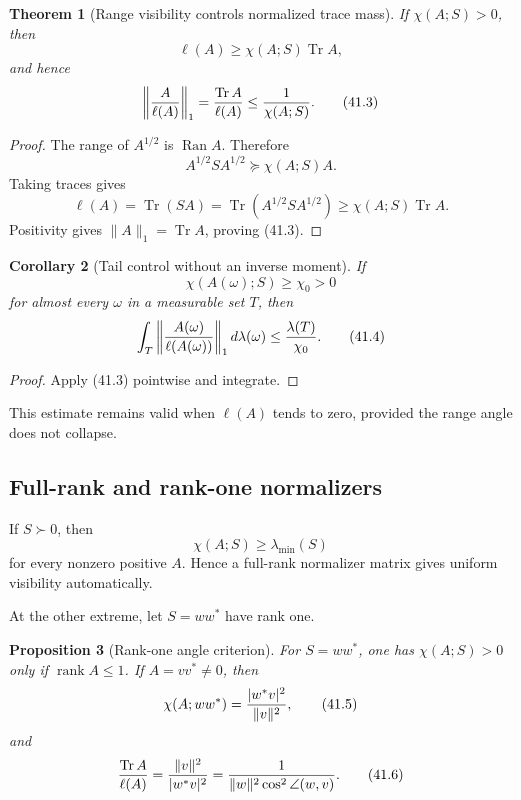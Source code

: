 \documentclass[11pt]{article}
\newtheorem{theorem}{Theorem}[section]
\newtheorem{proposition}[theorem]{Proposition}
\newtheorem{corollary}[theorem]{Corollary}
\theoremstyle{remark}
\begin{document}
\begin{theorem}[Range visibility controls normalized trace mass]
\label{thm:v12v41-visibility}
If \(\chi(A;S)>0\), then
\begin{equation}
 \ell(A)\geq\chi(A;S)\operatorname{Tr}A,           \tag{41.2}
\end{equation}
and hence
\begin{equation}
 \left\|{A\over\ell(A)}\right\|_1
 =
 {\operatorname{Tr}A\over\ell(A)}
 \leq {1\over\chi(A;S)}.                          \tag{41.3}
\end{equation}
\end{theorem}

\begin{proof}
The range of \(A^{1/2}\) is \(\operatorname{Ran}A\).  Therefore
\[
 A^{1/2}SA^{1/2}
 \succeq
 \chi(A;S)A.
\]
Taking traces gives
\[
 \ell(A)
 =
 \operatorname{Tr}(SA)
 =
 \operatorname{Tr}(A^{1/2}SA^{1/2})
 \geq
 \chi(A;S)\operatorname{Tr}A.
\]
Positivity gives \(\|A\|_1=\operatorname{Tr}A\), proving (41.3).
\end{proof}

\begin{corollary}[Tail control without an inverse moment]
\label{cor:v12v41-tail}
If
\[
 \chi(A(\omega);S)\geq\chi_0>0
\]
for almost every \(\omega\) in a measurable set \(T\), then
\begin{equation}
 \int_T
 \left\|{A(\omega)\over\ell(A(\omega))}\right\|_1
 d\lambda(\omega)
 \leq{\lambda(T)\over\chi_0}.                    \tag{41.4}
\end{equation}
\end{corollary}

\begin{proof}
Apply (41.3) pointwise and integrate.
\end{proof}

This estimate remains valid when \(\ell(A)\) tends to zero, provided
the range angle does not collapse.

\subsection{Full-rank and rank-one normalizers}

If \(S\succ0\), then
\[
 \chi(A;S)\geq\lambda_{\min}(S)
\]
for every nonzero positive \(A\).  Hence a full-rank normalizer
matrix gives uniform visibility automatically.

At the other extreme, let \(S=ww^*\) have rank one.

\begin{proposition}[Rank-one angle criterion]
\label{prop:v12v41-angle}
For \(S=ww^*\), one has \(\chi(A;S)>0\) only if
\(\operatorname{rank}A\leq1\).  If \(A=vv^*\ne0\), then
\begin{equation}
 \chi(A;ww^*)
 =
 {|w^*v|^2\over\|v\|^2},                         \tag{41.5}
\end{equation}
and
\begin{equation}
 {\operatorname{Tr}A\over\ell(A)}
 =
 {\|v\|^2\over|w^*v|^2}
 =
 {1\over\|w\|^2\cos^2\angle(w,v)}.               \tag{41.6}
\end{equation}
\end{proposition}
\end{document}
